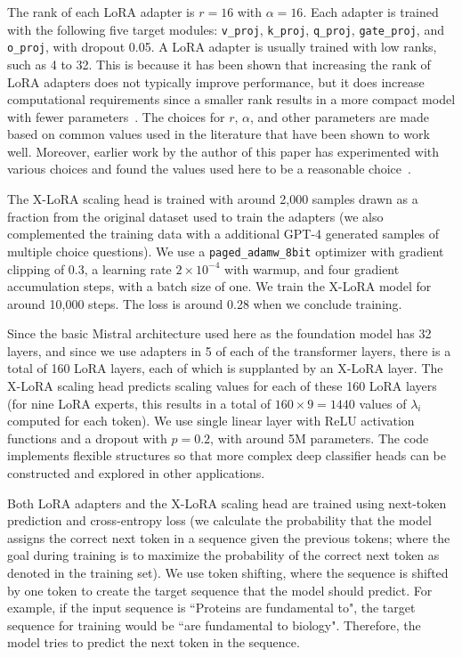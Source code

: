 The rank of each LoRA adapter is $r=16$ with $\alpha=16$. Each adapter is trained with the following five target  modules: \texttt{v\_proj}, \texttt{k\_proj}, \texttt{q\_proj},  \texttt{gate\_proj}, and \texttt{o\_proj}, with dropout 0.05. A LoRA adapter is usually trained with low ranks, such as 4 to 32. This is because it has been shown that increasing the rank of LoRA adapters does not typically improve performance, but it does increase computational requirements since a smaller rank results in a more compact model with fewer parameters~\cite{hu2021lora}. The choices for $r$, $\alpha$, and other parameters are made based on common values used in the literature that have been shown to work well. Moreover, earlier work by the author of this paper has experimented with various choices and found the values used here to be a reasonable choice~\cite{Luu2023BioinspiredLLM:Materials}. 


The X-LoRA scaling head is trained with around 2,000 samples drawn as a fraction from the original dataset used to train the adapters (we also complemented the training data with a additional GPT-4 generated samples of multiple choice questions). We use a \texttt{paged\_adamw\_8bit} optimizer with gradient clipping of 0.3, a learning rate $2\times 10^{-4}$ with warmup, and four gradient accumulation steps, with a batch size of one. We train the X-LoRA model for around 10,000 steps. The loss is around 0.28 when we conclude training. 

Since the basic Mistral architecture used here as the foundation model has 32 layers, and since we use adapters in 5 of each of the transformer layers, there is a total of 160 LoRA layers, each of which is supplanted by an X-LoRA layer. The X-LoRA scaling head predicts scaling values for each of these 160 LoRA layers (for nine LoRA experts, this results in a total of $160\times 9=1440$ values of $\lambda_i$ computed for each token). We use single linear layer with ReLU activation functions and a dropout with $p=0.2$, with around 5M parameters. The code implements flexible structures so that more complex deep classifier heads can be constructed and explored in other applications. 

Both LoRA adapters and the X-LoRA scaling head are trained using next-token prediction and cross-entropy loss (we calculate the probability that the model assigns the correct next token in a sequence given the previous tokens; where the goal during training is to maximize the probability of the correct next token as denoted in the training set). We use token shifting, where the sequence is  shifted by one token to create the target sequence that the model should predict. For example, if the input sequence is ``Proteins are fundamental to", the target sequence for training would be ``are fundamental to biology". Therefore, the model tries to predict the next token in the sequence.

